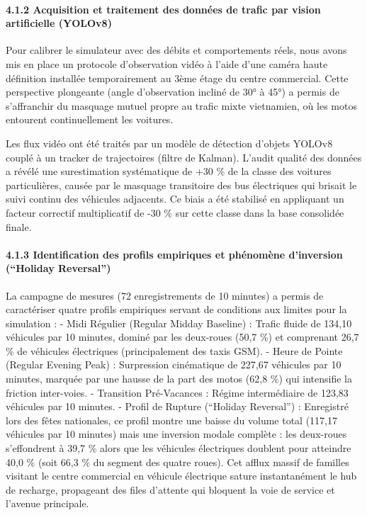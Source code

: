 \documentclass[10pt, a4paper]{article}
\begin{document}
\paragraph{4.1.2 Acquisition et traitement des données de trafic par
vision artificielle
(YOLOv8)}\label{acquisition-et-traitement-des-donnuxe9es-de-trafic-par-vision-artificielle-yolov8}

Pour calibrer le simulateur avec des débits et comportements réels, nous
avons mis en place un protocole d'observation vidéo à l'aide d'une
caméra haute définition installée temporairement au 3ème étage du centre
commercial. Cette perspective plongeante (angle d'observation incliné de
30° à 45°) a permis de s'affranchir du masquage mutuel propre au trafic
mixte vietnamien, où les motos entourent continuellement les voitures.

Les flux vidéo ont été traités par un modèle de détection d'objets
YOLOv8 couplé à un tracker de trajectoires (filtre de Kalman). L'audit
qualité des données a révélé une surestimation systématique de +30 \% de
la classe des voitures particulières, causée par le masquage transitoire
des bus électriques qui brisait le suivi continu des véhicules
adjacents. Ce biais a été stabilisé en appliquant un facteur correctif
multiplicatif de -30 \% sur cette classe dans la base consolidée finale.

\paragraph{4.1.3 Identification des profils empiriques et phénomène
d'inversion (``Holiday
Reversal'')}\label{identification-des-profils-empiriques-et-phuxe9nomuxe8ne-dinversion-holiday-reversal}

La campagne de mesures (72 enregistrements de 10 minutes) a permis de
caractériser quatre profils empiriques servant de conditions aux limites
pour la simulation : - Midi Régulier (Regular Midday Baseline) : Trafic
fluide de 134,10 véhicules par 10 minutes, dominé par les deux-roues
(50,7 \%) et comprenant 26,7 \% de véhicules électriques (principalement
des taxis GSM). - Heure de Pointe (Regular Evening Peak) : Surpression
cinématique de 227,67 véhicules par 10 minutes, marquée par une hausse
de la part des motos (62,8 \%) qui intensifie la friction inter-voies. -
Transition Pré-Vacances : Régime intermédiaire de 123,83 véhicules par
10 minutes. - Profil de Rupture (``Holiday Reversal'') : Enregistré lors
des fêtes nationales, ce profil montre une baisse du volume total
(117,17 véhicules par 10 minutes) mais une inversion modale complète :
les deux-roues s'effondrent à 39,7 \% alors que les véhicules
électriques doublent pour atteindre 40,0 \% (soit 66,3 \% du segment des
quatre roues). Cet afflux massif de familles visitant le centre
commercial en véhicule électrique sature instantanément le hub de
recharge, propageant des files d'attente qui bloquent la voie de service
et l'avenue principale.
\end{document}
